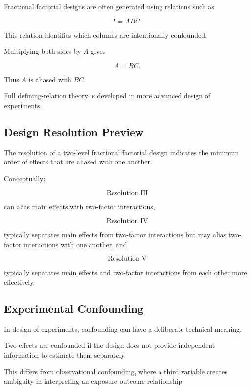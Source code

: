 Fractional factorial designs are often generated using relations such as

\[
\boxed{
I=ABC.
}
\]

This relation identifies which columns are intentionally confounded.

Multiplying both sides by \(A\) gives

\[
A=BC.
\]

Thus \(A\) is aliased with \(BC\).

Full defining-relation theory is developed in more advanced design of
experiments.

\subsection{Design Resolution Preview}
\label{subsec:design-resolution-preview}

The resolution of a two-level fractional factorial design indicates the
minimum order of effects that are aliased with one another.

Conceptually:

\[
\boxed{
\text{Resolution III}
}
\]

can alias main effects with two-factor interactions,

\[
\boxed{
\text{Resolution IV}
}
\]

typically separates main effects from two-factor interactions but may
alias two-factor interactions with one another, and

\[
\boxed{
\text{Resolution V}
}
\]

typically separates main effects and two-factor interactions from each
other more effectively.

\subsection{Experimental Confounding}
\label{subsec:experimental-confounding}

In design of experiments, confounding can have a deliberate technical
meaning.

Two effects are confounded if the design does not provide independent
information to estimate them separately.

This differs from observational confounding, where a third variable
creates ambiguity in interpreting an exposure-outcome relationship.

